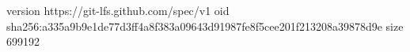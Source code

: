 version https://git-lfs.github.com/spec/v1
oid sha256:a335a9b9e1de77d3ff4a8f383a09643d91987fe8f5cee201f213208a39878d9e
size 699192
